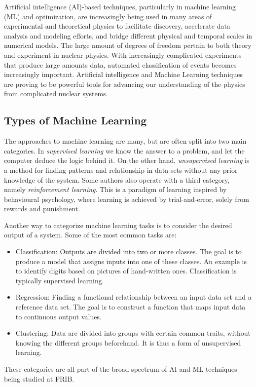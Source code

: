 \documentclass[%
10pt]{article}
\begin{document}
Artificial intelligence (AI)-based techniques, particularly in machine
learning (ML) and optimization, are increasingly being used in many areas
of experimental and theoretical physics to facilitate discovery,
accelerate data analysis and modeling efforts, and bridge different
physical and temporal scales in numerical models.
The large amount of degrees of freedom pertain to both theory and experiment in nuclear physics. With increasingly complicated experiments that produce large amounts data, automated classification of events becomes increasingly important. 
Artificial intelligence and Machine Learning   techniques are proving to be powerful tools for advancing our
understanding of the physics from complicated nuclear systems. 



\subsection{Types of Machine Learning}



The approaches to machine learning are many, but are often split into two main categories. 
In \emph{supervised learning} we know the answer to a problem,
and let the computer deduce the logic behind it. On the other hand, \emph{unsupervised learning}
is a method for finding patterns and relationship in data sets without any prior knowledge of the system.
Some authors also operate with a third category, namely \emph{reinforcement learning}. This is a paradigm 
of learning inspired by behavioural psychology, where learning is achieved by trial-and-error, 
solely from rewards and punishment.

Another way to categorize machine learning tasks is to consider the desired output of a system.
Some of the most common tasks are:

\begin{itemize}
  \item Classification: Outputs are divided into two or more classes. The goal is to   produce a model that assigns inputs into one of these classes. An example is to identify  digits based on pictures of hand-written ones. Classification is typically supervised learning.

  \item Regression: Finding a functional relationship between an input data set and a reference data set.   The goal is to construct a function that maps input data to continuous output values.

  \item Clustering: Data are divided into groups with certain common traits, without knowing the different groups beforehand.  It is thus a form of unsupervised learning.
\end{itemize}
These categories are all part of the broad spectrum of AI and ML techniques being studied at FRIB. 
\end{document}
